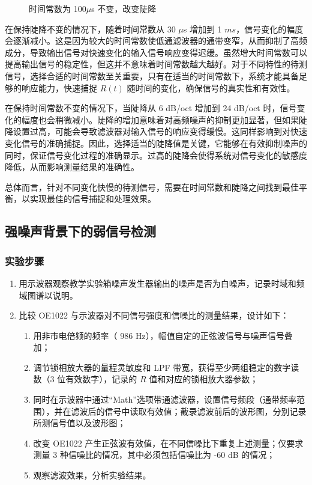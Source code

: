 \documentclass[dvipsnames, svgnames,a4paper,11pt]{article}
\begin{document}
	\begin{figure}[htbp]
		\centering
		\quad
		\quad
		\quad
		\quad
		\caption{时间常数为 100$\mu$s 不变，改变陡降}
		\label{时间常数为 100us 不变，改变陡降}
		\end{figure}	
		在保持陡降不变的情况下，随着时间常数从 30 $\mu$s 增加到 1 $ms$，信号变化的幅度会逐渐减小。这是因为较大的时间常数使低通滤波器的通带变窄，从而抑制了高频成分，导致输出信号对快速变化的输入信号响应变得迟缓。虽然增大时间常数可以提高输出信号的稳定性，但这并不意味着时间常数越大越好。对于不同特性的待测信号，选择合适的时间常数至关重要，只有在适当的时间常数下，系统才能具备足够的响应能力，快速捕捉 \( R(t) \) 随时间的变化，确保信号的真实性和有效性。

		在保持时间常数不变的情况下，当陡降从 6 dB/oct 增加到 24 dB/oct 时，信号变化的幅度也会稍微减小。陡降的增加意味着对高频噪声的抑制更加显著，但如果陡降设置过高，可能会导致滤波器对输入信号的响应变得缓慢。这同样影响到对快速变化信号的准确捕捉。因此，选择适当的陡降值是关键，它能够在有效抑制噪声的同时，保证信号变化过程的准确显示。过高的陡降会使得系统对信号变化的敏感度降低，从而影响测量结果的准确性。
		
		总体而言，针对不同变化快慢的待测信号，需要在时间常数和陡降之间找到最佳平衡，以实现最佳的信号捕捉和处理效果。
	\subsection{强噪声背景下的弱信号检测}
\subsubsection{实验步骤}
\begin{enumerate}
    \item 用示波器观察教学实验箱噪声发生器输出的噪声是否为白噪声，记录时域和频域图谱以说明。
    \item 比较 OE1022 与示波器对不同信号强度和信噪比的测量结果，设计如下：
    \begin{enumerate}
        \item 用非市电倍频的频率（ 986 Hz），幅值自定的正弦波信号与噪声信号叠加；
        \item 调节锁相放大器的量程灵敏度和 LPF 带宽，获得至少两组稳定的数字读数（3 位有效数字），记录的 \( R \) 值和对应的锁相放大器参数；
        \item 同时在示波器中通过“Math”选项带通滤波器，设置信号频段（通带频率范围），并在滤波后的信号中读取有效值；截录滤波前后的波形图，分别记录所测信号值以及波形图；
        \item 改变 OE1022 产生正弦波有效值，在不同信噪比下重复上述测量；仅要求测量 3 种信噪比的情况，其中必须包括信噪比为 -60 dB 的情况；
        \item 观察滤波效果，分析实验结果。
    \end{enumerate}
\end{enumerate}
\end{document}
